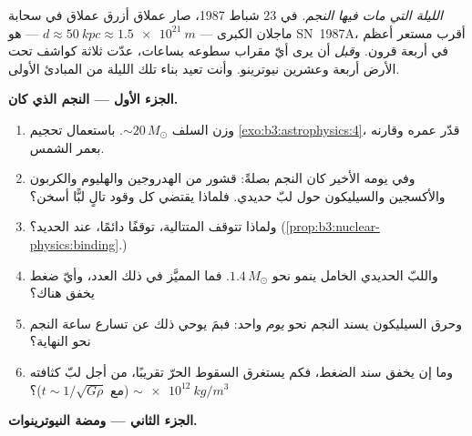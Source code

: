 \begin{problem}\label{pb:b3:astrophysics:1}
\emph{الليلة التي مات فيها النجم.} في 23 شباط 1987، صار عملاق
أزرق عملاق في سحابة ماجلان الكبرى --- $d \approx
\qty{50}{kpc} \approx \qty{1.5e21}{m}$ --- هو SN~1987A، أقرب
مستعر أعظم في أربعة قرون. و\emph{قبل} أن يرى أيّ مقراب سطوعه
بساعات، عدّت ثلاثة كواشف تحت الأرض
أربعة وعشرين نيوترينو. وأنت تعيد بناء تلك الليلة من المبادئ
الأولى.

\medskip\noindent\textbf{الجزء الأول --- النجم الذي كان.}

\begin{enumerate}
  \item وزن السلف ${\sim}20\,M_\odot$. باستعمال
        تحجيم \cref{exo:b3:astrophysics:4}، قدّر
        عمره وقارنه بعمر الشمس.
  \item وفي يومه الأخير كان النجم بصلةً: قشور من الهدروجين والهليوم والكربون والأكسجين والسيليكون
        حول لبّ حديدي. فلماذا يقتضي كل وقود تالٍ لبًّا أسخن؟
  \item ولماذا تتوقف المتتالية، توقفًا دائمًا، عند الحديد؟
        (\cref{prop:b3:nuclear-physics:binding}.)
  \item واللبّ الحديدي الخامل ينمو نحو $1.4\,M_\odot$. فما
        المميَّز في ذلك العدد، وأيّ ضغط يخفق
        هناك؟
  \item وحرق السيليكون يسند النجم نحو
        \emph{يوم} واحد: فبمَ يوحي ذلك عن تسارع ساعة
        النجم نحو النهاية؟
  \item وما إن يخفق سند الضغط، فكم يستغرق السقوط
        الحرّ تقريبًا، من أجل لبّ كثافته
        $\sim\qty{e12}{kg/m^3}$ (مع $t \sim 1/\sqrt{G\rho}$)؟
\end{enumerate}

\medskip\noindent\textbf{الجزء الثاني --- ومضة النيوترينوات.}


\end{problem}
